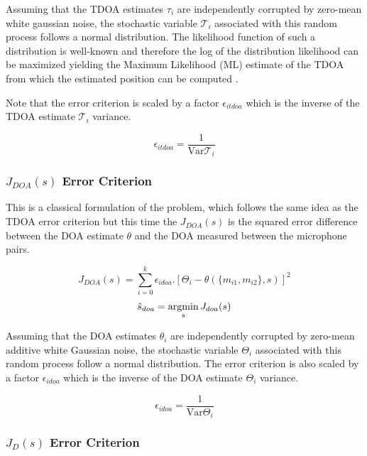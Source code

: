 Assuming that the TDOA estimates $\tau_{i}$ are independently corrupted by zero-mean white gaussian noise, the stochastic variable $\mathcal{T}_{i}$ associated with this random process follows a normal distribution. The likelihood function of such a distribution is well-known and therefore the log of the distribution likelihood can be maximized yielding the Maximum Likelihood (ML) estimate of the TDOA from which the estimated position can be computed . 

Note that the error criterion is scaled by a factor $\epsilon_{itdoa}$ which is the inverse of the TDOA estimate $\mathcal{T}_{i}$ variance. 

\begin{equation}
\epsilon_{itdoa}=\frac{1}{\mathrm{Var}{\mathcal{T}_{i}}}
\label{eq:epsilonjtdoa}
\end{equation}

\subsubsection{$J_{DOA}(s)$ Error Criterion}

This is a classical formulation of the problem, which follows the same idea as the TDOA error criterion but this time the $J_{DOA}(s)$ is the squared error difference between the DOA estimate $\theta$ and the DOA measured between the microphone pairs. 

\begin{equation}
J_{DOA}(s) = {\sum}_{i=0}^k \epsilon_{idoa}.[\Theta_{i}-\theta(\{m_{i1},m_{i2}\},s)]^2
\label{eq:jdoa}
\end{equation}
\begin{equation}
\hat{s}_{doa}= \argmin_{s} J_{doa}(s) 
\end{equation}


Assuming that the DOA estimates $\theta_{i}$ are independently corrupted by zero-mean additive white Gaussian noise, the stochastic variable $\Theta_{i}$ associated with this random process follow a normal distribution. The error criterion is also scaled by a factor $\epsilon_{idoa}$ which is the inverse of the DOA estimate $\Theta_{i}$ variance. 

\begin{equation}
\epsilon_{idoa}=\frac{1}{\mathrm{Var}{\Theta_{i}}}
\label{eq:epsilonjtdoa}
\end{equation}

\subsubsection{$J_{D}(s)$ Error Criterion}

